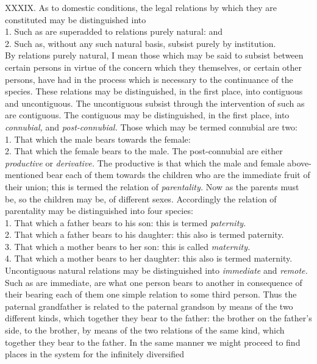 \documentclass[12pt]{report}
\begin{document}
XXXIX. As to domestic conditions, the legal relations by which they are
constituted may be distinguished into\\
1. Such as are superadded to relations purely natural: and\\
2. Such as, without any such natural basis, subsist purely by
institution.\\
By relations purely natural, I mean those which may be said to subsist
between certain persons in virtue of the concern which they themselves,
or certain other persons, have had in the process which is necessary to
the continuance of the species. These relations may be distinguished, in
the first place, into contiguous and uncontiguous. The uncontiguous
subsist through the intervention of such as are contiguous. The
contiguous may be distinguished, in the first place, into
\emph{connubial,} and \emph{post-connubial.} Those which may be termed
connubial are two:\\
1. That which the male bears towards the female:\\
2. That which the female bears to the male. The post-connubial are
either \emph{productive} or \emph{derivative.} The productive is that
which the male and female above-mentioned bear each of them towards the
children who are the immediate fruit of their union; this is termed the
relation of \emph{parentality.} Now as the parents must be, so the
children may be, of different sexes. Accordingly the relation of
parentality may be distinguished into four species:\\
1. That which a father bears to his son: this is termed
\emph{paternity.}\\
2. That which a father bears to his daughter: this also is termed
paternity.\\
3. That which a mother bears to her son: this is called
\emph{maternity.}\\
4. That which a mother bears to her daughter: this also is termed
maternity. Uncontiguous natural relations may be distinguished into
\emph{immediate} and \emph{remote.} Such as are immediate, are what one
person bears to another in consequence of their bearing each of them one
simple relation to some third person. Thus the paternal grandfather is
related to the paternal grandson by means of the two different kinds,
which together they bear to the father: the brother on the father's
side, to the brother, by means of the two relations of the same kind,
which together they bear to the father. In the same manner we might
proceed to find places in the system for the infinitely diversified
\end{document}
